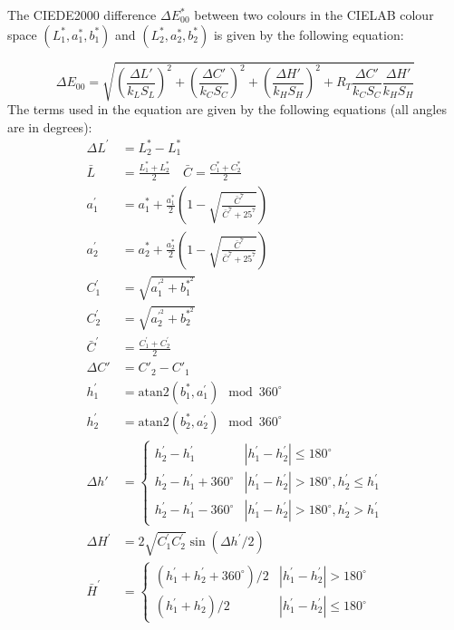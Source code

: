 \documentclass[12pt,twoside,notitlepage]{report}
\begin{document}
The CIEDE2000 difference $\Delta E_{00}^*$ between two colours in the CIELAB colour space $(L^*_1, a^*_1, b^*_1)$ and $(L^*_2, a^*_2, b^*_2)$ is given by the following equation:

\begin{equation}
\Delta E_{00} = \sqrt{ \left(\frac{\Delta L'}{k_L S_L}\right)^2 + \left(\frac{\Delta C'}{k_C S_C}\right)^2 + \left(\frac{\Delta H'}{k_H S_H}\right)^2 + R_T \frac{\Delta C'}{k_C S_C}\frac{\Delta H'}{k_H S_H} }
\end{equation}
The terms used in the equation are given by the following equations (all angles are in degrees):
\begin{align}
\Delta L^\prime &= L^*_2 - L^*_1 \\
\bar{L}&= \frac{L^*_1 + L^*_2}{2} \quad \bar{C} = \frac{C^*_1 + C^*_2}{2} \\
a_1^\prime &= a_1^* + \frac{a_1^*}{2} \left( 1 - \sqrt{\frac{\bar{C}^7}{\bar{C}^7 + 25^7}} \right) \\
a_2^\prime &= a_2^* + \frac{a_2^*}{2} \left( 1 - \sqrt{\frac{\bar{C}^7}{\bar{C}^7 + 25^7}} \right) \\
C_1^\prime &= \sqrt{a_1^{'^2} + b_1^{*^2}} \\
C_2^\prime &= \sqrt{a_2^{'^2} + b_2^{*^2}} \\
\bar{C}^\prime &= \frac{C_1^\prime + C_2^\prime}{2} \\
\Delta{C'}&=C'_2-C'_1 \\
h_1^\prime&=\text{atan2} (b_1^*, a_1^\prime) \mod 360^\circ \\
h_2^\prime&=\text{atan2} (b_2^*, a_2^\prime) \mod 360^\circ \\
\Delta h' &= \begin{cases}
h_2^\prime - h_1^\prime & \left| h_1^\prime - h_2^\prime \right| \leq 180^\circ \\
h_2^\prime - h_1^\prime + 360^\circ & \left| h_1^\prime - h_2^\prime \right| > 180^\circ, h_2^\prime \leq h_1^\prime \\
h_2^\prime - h_1^\prime - 360^\circ & \left| h_1^\prime - h_2^\prime \right| > 180^\circ, h_2^\prime > h_1^\prime
\end{cases} \\
\Delta H^\prime &= 2 \sqrt{C_1^\prime C_2^\prime} \sin (\Delta h^\prime/2) \\
\bar{H}^\prime&=\begin{cases}
(h_1^\prime + h_2^\prime + 360^\circ)/2 & \left| h_1^\prime - h_2^\prime \right| > 180^\circ \\
(h_1^\prime + h_2^\prime)/2 & \left| h_1^\prime - h_2^\prime \right| \leq 180^\circ

\end{cases}
\end{align}
\end{document}
